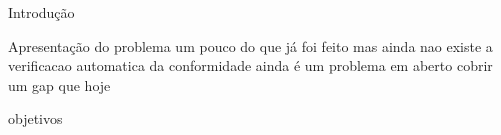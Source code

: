 Introdução

Apresentação do problema
um pouco do que já foi feito
mas ainda nao existe a verificacao automatica da conformidade
ainda é um problema em aberto
cobrir um gap que hoje


objetivos
